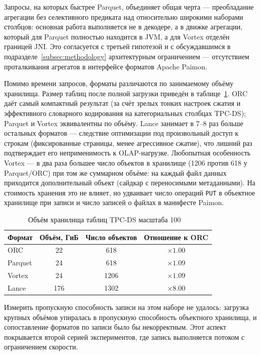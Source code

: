 Запросы, на которых быстрее Parquet, объединяет общая черта --- преобладание
агрегации без селективного предиката над относительно широкими наборами столбцов:
основная работа выполняется не в декодере, а в движке агрегации, который для Parquet
полностью находится в JVM, а для Vortex отделён границей JNI. Это согласуется с
третьей гипотезой и с обсуждавшимся в подразделе~\ref{subsec:methodology}
архитектурным ограничением --- отсутствием проталкивания агрегатов в интерфейсе
форматов Apache Paimon.

Помимо времени запросов, форматы различаются по занимаемому объёму хранилища.
Размер таблиц после полной загрузки приведён в таблице~\ref{tab:tpcds-size}. ORC даёт самый компактный результат (за счёт зрелых
тонких настроек сжатия и эффективного словарного кодирования на категориальных
столбцах TPC-DS); Parquet и Vortex эквивалентны по объёму. Lance занимает в 7--8
раз больше остальных форматов --- следствие оптимизации под произвольный доступ к
строкам (фиксированные страницы, менее агрессивное сжатие), что лишний раз
подтверждает его неприменимость к OLAP-нагрузке. Любопытная особенность Vortex ---
в два раза большее число объектов в хранилище (1206 против 618 у Parquet/ORC) при
том же суммарном объёме: на каждый файл данных приходится дополнительный объект
(сайдкар с переносимыми метаданными). На стоимость хранения это не влияет, но
удваивает число операций \texttt{PUT} в объектное хранилище при записи и число
записей о файлах в манифесте Paimon.

\begin{table}
    \caption{Объём хранилища таблиц TPC-DS масштаба \SI{100}{\giga\byte}}
    \label{tab:tpcds-size}
    \begin{tabularx}{\textwidth}{|X|c|c|c|}\hline
    \textbf{Формат} & \textbf{Объём, ГиБ} & \textbf{Число объектов} & \textbf{Отношение к ORC} \\ \hline
    ORC     & 22  & 618  & ${\times}1.00$ \\ \hline
    Parquet & 24  & 618  & ${\times}1.09$ \\ \hline
    Vortex  & 24  & 1206 & ${\times}1.09$ \\ \hline
    Lance   & 176 & 1302 & ${\times}8.00$ \\ \hline
    \end{tabularx}
\end{table}

Измерить пропускную способность записи на этом наборе не удалось: загрузка крупных
объёмов упиралась в пропускную способность объектного хранилища, и сопоставление
форматов по записи было бы некорректным. Этот аспект покрывается второй серией
экспериментов, где запись выполняется потоком с ограничением скорости.
